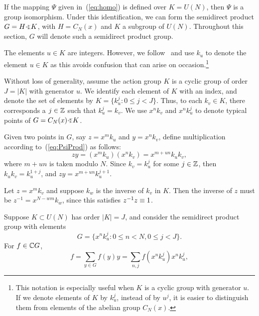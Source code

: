 If the mapping $\Psi$ given in~(\ref{eq:homo}) is defined over
$K=U(N)$, then $\Psi$ is a group isomorphism.
Under this identification, we can form the semidirect
product $G = H\sdp K$, with $H = C_N(x)$ and $K$ a
subgroup of $U(N)$.  Throughout this section, $G$ will
denote such a semidirect product group.

The elements $u\in K$ are integers.
However, we follow~\cite{An:2003} and 
use $k_u$ to denote the element
$u\in K$ as this avoids confusion that can arise 
on occasion.\footnote{This notation is especially useful when $K$ 
is a cyclic group with generator $u$.  If  we denote elements of $K$ by $k_u^j$, instead of 
by $u^j$, it is easier to distinguish them from elements of the abelian group $C_N(x)$.}

Without loss of generality, assume the action 
group $K$ is a cyclic  group of order $J = |K|$ with generator
$u$. We identify each element of $K$ with an index, and denote 
the set of elements by $K = \{k_u^j: 0\leq j < J\}$.
Thus, to each $k_v \in K$, there corresponds a $j\in \mathbb{Z}$ 
such that $k_u^j=k_v$.
We use $x^n k_v$ and $x^n k_u^j$ to denote  
typical points of $G=C_N(x)\sdp K$.

Given two points in $G$, say $z = x^m k_u$
and $y=x^n k_v$, define multiplication %
according
to~(\ref{eq:PsiProd}) as follows:
\begin{equation}\label{eq:prod}
  zy = (x^m k_u)(x^n k_v) = x^{m+u n} k_u k_v,
\end{equation}
where %
$m+ u n$ is taken modulo $N$.
Since $k_v=k_u^j$ for some $j\in \mathbb{Z}$, then 
$k_u k_v = k_u^{1+j}$, and $zy = x^{m+u n} k_u^{j+1}$.

Let $z = x^m k_v$ and suppose $k_w$ is the inverse 
of $k_v$ in $K$.  Then the inverse of $z$ must be
$z^{-1}=x^{N-wm} k_w$, since this satisfies
$z^{-1}z \equiv 1$.

Suppose $K \subset U(N)$ has order $|K|=J$, 
and consider the semidirect product group
with elements
\begin{equation}
  G   = \{x^n k_u^j : 0 \leq n < N, 0 \leq j < J\}.\label{eq:sdp}
\end{equation}
For $f\in \mathbb{C} G$, %
\begin{equation}
  f = \sum_{y\in G} f(y)y= \sum_{n,j} f(x^n k_u^j)x^n k_u^j,
\end{equation}

